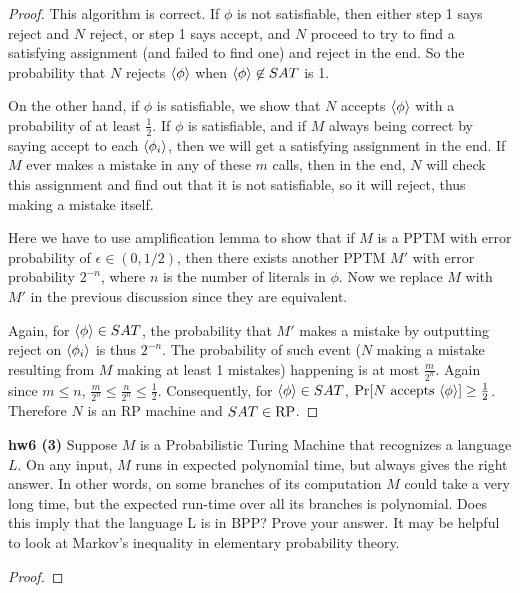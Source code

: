 \begin{mdframed}
\begin{proof}
\medskip
This algorithm is correct. If $\phi$ is not satisfiable, then either step 1 says reject and $N$ reject, or step 1 says accept, and $N$ proceed to try to find a satisfying assignment (and failed to find one) and reject in the end. So the probability that $N$ rejects $\langle{\phi}\rangle$ when $\langle{\phi}\rangle \not \in SAT$ is 1. 

\medskip
On the other hand, if $\phi$ is satisfiable, we show that $N$ accepts $\langle{\phi}\rangle$ with a probability of at least $\frac{1}{2}$. If $\phi$ is satisfiable, and if $M$ always being correct by saying accept to each $\langle{\phi_i}\rangle$, then we will get a satisfying assignment in the end. If $M$ ever makes a mistake in any of these $m$ calls, then in the end, $N$ will check this assignment and find out that it is not satisfiable, so it will reject, thus making a mistake itself. 

\medskip
Here we have to use amplification lemma to show that if $M$ is a PPTM with error probability of $\epsilon \in (0, 1/2)$, then there exists another PPTM $M'$ with error probability $2^{-n}$, where $n$ is the number of literals in $\phi$. Now we replace $M$ with $M'$ in the previous discussion since they are equivalent.

\medskip
Again, for $\langle{\phi}\rangle \in SAT$, the probability that $M'$ makes a mistake by outputting reject on $\langle{\phi_i}\rangle$ is thus $2^{-n}$. The probability of such event ($N$ making a mistake resulting from $M$ making at least 1 mistakes) happening is at most $\frac{m}{2^n}$. Again since $m \leq n$, $\frac{m}{2^n} \leq \frac{n}{2^n} \leq \frac{1}{2}$. Consequently, for $\langle{\phi}\rangle \in SAT$, $\text{Pr} [N \text{ accepts } \langle{\phi}\rangle] \geq \frac{1}{2}$. Therefore $N$ is an RP machine and $SAT \in \text{RP}$.
\end{proof}
\end{mdframed}

\textbf{hw6 (3)} Suppose $M$ is a Probabilistic Turing Machine that recognizes a language $L$. On any input, $M$ runs in expected polynomial time, but always gives the right answer. In other words, on some branches of its computation $M$ could take a very long time, but the expected run-time over all its branches is polynomial. Does this imply that the language L is in BPP? Prove your answer. It may be helpful to look at
Markov's inequality in elementary probability theory.

\begin{mdframed}
\begin{proof}

\end{proof}
\end{mdframed}

